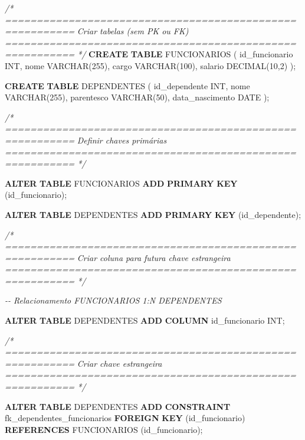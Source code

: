 \documentclass[
]{book}
\newenvironment{Shaded}{\begin{snugshade}}{\end{snugshade}}
\newcommand{\CommentTok}[1]{\textcolor[rgb]{0.56,0.35,0.01}{\textit{#1}}}
\newcommand{\DataTypeTok}[1]{\textcolor[rgb]{0.13,0.29,0.53}{#1}}
\newcommand{\DecValTok}[1]{\textcolor[rgb]{0.00,0.00,0.81}{#1}}
\newcommand{\KeywordTok}[1]{\textcolor[rgb]{0.13,0.29,0.53}{\textbf{#1}}}
\newcommand{\NormalTok}[1]{#1}
\begin{document}
\begin{Shaded}
\begin{Highlighting}[]
\CommentTok{/* =========================================================}
\CommentTok{   Criar tabelas (sem PK ou FK)}
\CommentTok{   ========================================================= */}
\KeywordTok{CREATE} \KeywordTok{TABLE}\NormalTok{ FUNCIONARIOS }
\NormalTok{(}
\NormalTok{    id\_funcionario }\DataTypeTok{INT}\NormalTok{,}
\NormalTok{    nome }\DataTypeTok{VARCHAR}\NormalTok{(}\DecValTok{255}\NormalTok{),}
\NormalTok{    cargo }\DataTypeTok{VARCHAR}\NormalTok{(}\DecValTok{100}\NormalTok{),}
\NormalTok{    salario }\DataTypeTok{DECIMAL}\NormalTok{(}\DecValTok{10}\NormalTok{,}\DecValTok{2}\NormalTok{)}
\NormalTok{);}

\KeywordTok{CREATE} \KeywordTok{TABLE}\NormalTok{ DEPENDENTES }
\NormalTok{(}
\NormalTok{    id\_dependente }\DataTypeTok{INT}\NormalTok{,}
\NormalTok{    nome }\DataTypeTok{VARCHAR}\NormalTok{(}\DecValTok{255}\NormalTok{),}
\NormalTok{    parentesco }\DataTypeTok{VARCHAR}\NormalTok{(}\DecValTok{50}\NormalTok{),}
\NormalTok{    data\_nascimento }\DataTypeTok{DATE}
\NormalTok{);}

\CommentTok{/* =========================================================}
\CommentTok{   Definir chaves primárias}
\CommentTok{   ========================================================= */}

\KeywordTok{ALTER} \KeywordTok{TABLE}\NormalTok{ FUNCIONARIOS }\KeywordTok{ADD} \KeywordTok{PRIMARY} \KeywordTok{KEY}\NormalTok{ (id\_funcionario);}

\KeywordTok{ALTER} \KeywordTok{TABLE}\NormalTok{ DEPENDENTES }\KeywordTok{ADD} \KeywordTok{PRIMARY} \KeywordTok{KEY}\NormalTok{ (id\_dependente);}

\CommentTok{/* =========================================================}
\CommentTok{   Criar coluna para futura chave estrangeira}
\CommentTok{   ========================================================= */}

\CommentTok{{-}{-} Relacionamento FUNCIONARIOS 1:N DEPENDENTES}

\KeywordTok{ALTER} \KeywordTok{TABLE}\NormalTok{ DEPENDENTES }\KeywordTok{ADD} \KeywordTok{COLUMN}\NormalTok{ id\_funcionario }\DataTypeTok{INT}\NormalTok{;}

\CommentTok{/* =========================================================}
\CommentTok{   Criar chave estrangeira}
\CommentTok{   ========================================================= */}

\KeywordTok{ALTER} \KeywordTok{TABLE}\NormalTok{ DEPENDENTES }\KeywordTok{ADD} \KeywordTok{CONSTRAINT}\NormalTok{ fk\_dependentes\_funcionarios }\KeywordTok{FOREIGN} \KeywordTok{KEY}\NormalTok{ (id\_funcionario) }\KeywordTok{REFERENCES}\NormalTok{ FUNCIONARIOS  (id\_funcionario);}
\end{Highlighting}
\end{Shaded}
\end{document}
